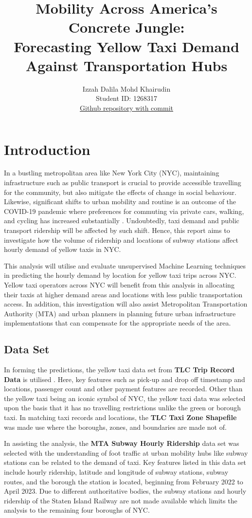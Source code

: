 \documentclass[11pt]{article}
\title{\textbf{Mobility Across America's Concrete Jungle:} \\ Forecasting Yellow Taxi Demand Against Transportation Hubs}
\author{
Izzah Dalila Mohd Khairudin \\
Student ID: 1268317 \\
\href{https://github.com/MAST30034-Applied-Data-Science/mast30034-project-1-duhleelah}{Github repository with commit}
}
\begin{document}
\maketitle

\section{Introduction}
In a bustling metropolitan area like New York City (NYC), maintaining infrastructure such as public transport is crucial to provide accessible travelling for the community, but also mitigate the effects of change in social behaviour. Likewise, significant shifts to urban mobility and routine is an outcome of the COVID-19 pandemic where preferences for commuting via private cars, walking, and cycling has increased substantially \cite{2022urbanmobilitypaper}. Undoubtedly, taxi demand and public transport ridership will be affected by such shift. Hence, this report aims to investigate how the volume of ridership and locations of subway stations affect hourly demand of yellow taxis in NYC.

This analysis will utilise and evaluate unsupervised Machine Learning techniques in predicting the hourly demand by location for yellow taxi trips across NYC. Yellow taxi operators across NYC will benefit from this analysis in allocating their taxis at higher demand areas and locations with less public transportation access. In addition, this investigation will also assist Metropolitan Transportation Authority (MTA) and urban planners in planning future urban infrastructure implementations that can compensate for the appropriate needs of the area.

\subsection{Data Set}
In forming the predictions, the yellow taxi data set from \textbf{TLC Trip Record Data} is utilised \cite{2022YellowTaxiData}. Here, key features such as pick-up and drop off timestamp and locations, passenger count and other payment features are recorded. Other than the yellow taxi being an iconic symbol of NYC, the yellow taxi data was selected upon the basis that it has no travelling restrictions unlike the green or borough taxi. In matching taxi records and locations, the \textbf{TLC Taxi Zone Shapefile} was made use where the boroughs, zones, and boundaries are made not of. 

In assisting the analysis, the \textbf{MTA Subway Hourly Ridership}\cite{SubwayRidership} data set was selected with the understanding of foot traffic at urban mobility hubs like subway stations can be related to the demand of taxi. Key features listed in this data set include hourly ridership, latitude and longitude of subway stations, subway routes, and the borough the station is located, beginning from February 2022 to April 2023. Due to different authoritative bodies, the subway stations and hourly ridership of the Staten Island Railway are not made available which limits the analysis to the remaining four boroughs of NYC. 
\end{document}
